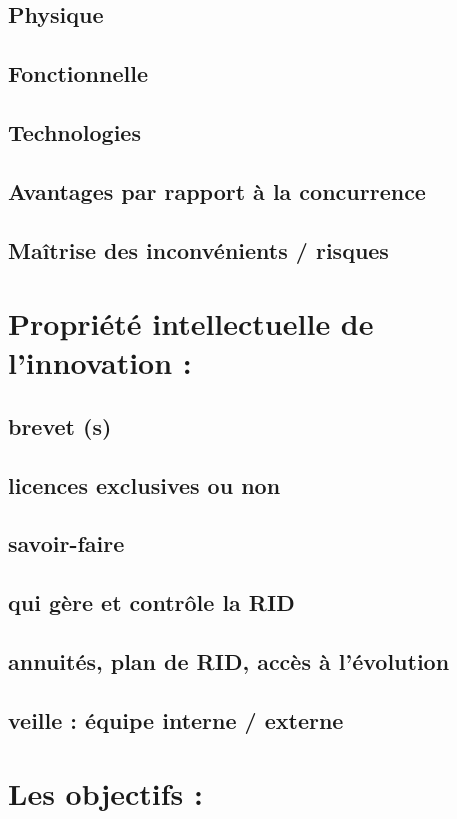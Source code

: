 	\subsection{Physique}
	\subsection{Fonctionnelle}
	\subsection{Technologies}
	\subsection{Avantages par rapport à la concurrence}
	\subsection{Maîtrise des inconvénients / risques}

\section{Propriété intellectuelle de l'innovation :}
	\subsection{brevet (s)}
	\subsection{licences exclusives ou non}
	\subsection{savoir-faire}
	\subsection{qui gère et contrôle la RID}
	\subsection{annuités, plan de RID, accès à l'évolution}
	\subsection{veille : équipe interne / externe}

\section{Les objectifs :}
